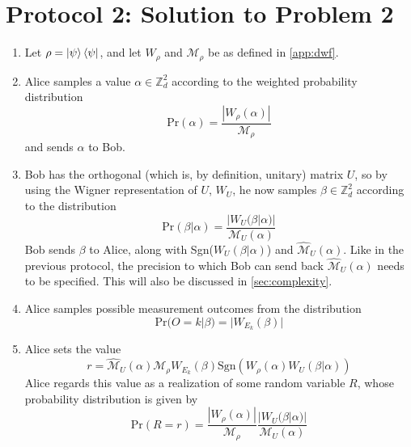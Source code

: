 \documentclass[../3Wworkreport.tex]{subfiles}
\begin{document}
\section{Protocol 2: Solution to Problem 2}
\label{sec:protocol2}
\begin{enumerate}
	\item
		Let $\rho = \ket{\psi}\bra{\psi}$, and let $W_\rho$ and $\mathcal{M}_\rho$ be as defined in \autoref{app:dwf}.
	\item
		Alice samples a value $\alpha \in \mathbb{Z}_d^2$ according to the weighted probability distribution 
		\begin{equation}
			\text{Pr}(\alpha) = \frac{|W_\rho(\alpha)|}{\mathcal{M}_\rho}
		\end{equation}
		and sends $\alpha$ to Bob.

	\item
		Bob has the orthogonal (which is, by definition, unitary) matrix $U$, so by using the Wigner representation of $U$, $W_U$, he now samples $\beta \in \mathbb{Z}_d^2$ according to the distribution
		\begin{equation}
			\text{Pr}(\beta|\alpha) = \frac{|W_U(\beta|\alpha)|}{\mathcal{M}_U(\alpha)}
		\end{equation}
		Bob sends $\beta$ to Alice, along with Sgn($W_U(\beta|\alpha)$) and $\hat{\mathcal{M}}_U(\alpha)$. Like in the previous protocol, the precision to which Bob can send back $\hat{\mathcal{M}}_U(\alpha)$ needs to be specified. This will also be discussed in \autoref{sec:complexity}.

	\item
		Alice samples possible measurement outcomes from the distribution
		\begin{equation}
			\text{Pr}(O = k | \beta) = |W_{E_k}(\beta)|
		\end{equation}

	 \item
		Alice sets the value
		\begin{equation}
			r = \hat{\mathcal{M}}_U(\alpha) \mathcal{M}_\rho W_{E_k}(\beta) \text{Sgn}(W_\rho(\alpha) W_U(\beta|\alpha))
		\end{equation}
		Alice regards this value as a realization of some random variable $R$, whose probability distribution is given by
		\begin{equation}
			\text{Pr}(R = r) = \frac{|W_\rho(\alpha)|}{\mathcal{M}_\rho} \frac{|W_U(\beta|\alpha)|}{\mathcal{M}_U(\alpha)}
		\end{equation}


\end{enumerate}
\end{document}
